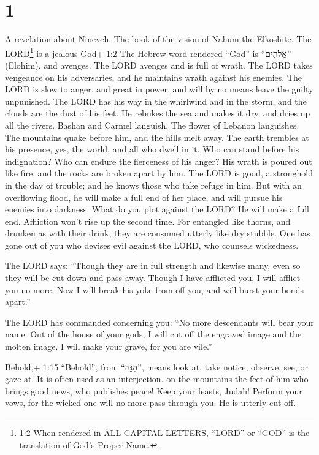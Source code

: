 \hypertarget{section}{%
\section{1}\label{section}}

 A revelation about Nineveh. The book of the vision of Nahum
the Elkoshite.  The LORD\footnote{1:2 When rendered in ALL
  CAPITAL LETTERS, ``LORD'' or ``GOD'' is the translation of God's
  Proper Name.} is a jealous God+ 1:2 The Hebrew word rendered ``God''
is ``אֱלֹהִ֑ים'' (Elohim). and avenges. The LORD avenges and is full of
wrath. The LORD takes vengeance on his adversaries, and he maintains
wrath against his enemies.  The LORD is slow to anger, and
great in power, and will by no means leave the guilty unpunished. The
LORD has his way in the whirlwind and in the storm, and the clouds are
the dust of his feet.  He rebukes the sea and makes it dry,
and dries up all the rivers. Bashan and Carmel languish. The flower of
Lebanon languishes.  The mountains quake before him, and the
hills melt away. The earth trembles at his presence, yes, the world, and
all who dwell in it.  Who can stand before his indignation?
Who can endure the fierceness of his anger? His wrath is poured out like
fire, and the rocks are broken apart by him.  The LORD is
good, a stronghold in the day of trouble; and he knows those who take
refuge in him.  But with an overflowing flood, he will make
a full end of her place, and will pursue his enemies into darkness.
 What do you plot against the LORD? He will make a full end.
Affliction won't rise up the second time.  For entangled
like thorns, and drunken as with their drink, they are consumed utterly
like dry stubble.  One has gone out of you who devises evil
against the LORD, who counsels wickedness.

 The LORD says: ``Though they are in full strength and
likewise many, even so they will be cut down and pass away. Though I
have afflicted you, I will afflict you no more.  Now I will
break his yoke from off you, and will burst your bonds apart.''

 The LORD has commanded concerning you: ``No more
descendants will bear your name. Out of the house of your gods, I will
cut off the engraved image and the molten image. I will make your grave,
for you are vile.''

 Behold,+ 1:15 ``Behold'', from ``הִנֵּה'', means look at,
take notice, observe, see, or gaze at. It is often used as an
interjection. on the mountains the feet of him who brings good news, who
publishes peace! Keep your feasts, Judah! Perform your vows, for the
wicked one will no more pass through you. He is utterly cut off.

